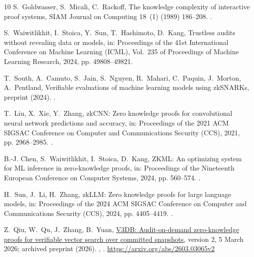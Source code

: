 \documentclass[5p,times,twocolumn]{elsarticle}
\begin{document}
\begin{thebibliography}{10}
S.~Goldwasser, S.~Micali, C.~Rackoff, The knowledge complexity of interactive
  proof systems, SIAM Journal on Computing 18~(1) (1989) 186--208.
\newblock \href {https://doi.org/10.1137/0218012} {}.

S.~Waiwitlikhit, I.~Stoica, Y.~Sun, T.~Hashimoto, D.~Kang, Trustless audits without revealing data or models, in: Proceedings of the 41st International Conference on Machine Learning (ICML), Vol.~235 of Proceedings of Machine Learning Research, 2024, pp. 49808--49821.

T.~South, A.~Camuto, S.~Jain, S.~Nguyen, R.~Mahari, C.~Paquin, J.~Morton,
  A.~Pentland, Verifiable evaluations of machine learning models using
  {zkSNARKs}, preprint (2024).
\newblock \href {http://arxiv.org/abs/2402.02675} {}.


T.~Liu, X.~Xie, Y.~Zhang, {zkCNN}: Zero knowledge proofs for convolutional neural network predictions and accuracy, in: Proceedings of the 2021 ACM SIGSAC Conference on Computer and Communications Security (CCS), 2021, pp. 2968--2985. \newblock \href {https://doi.org/10.1145/3460120.3485379} {}.

B.-J. Chen, S.~Waiwitlikhit, I.~Stoica, D.~Kang, {ZKML}: An optimizing system
  for {ML} inference in zero-knowledge proofs, in: Proceedings of the
  Nineteenth European Conference on Computer Systems, 2024, pp. 560--574.
\newblock \href {https://doi.org/10.1145/3627703.3650088}
  {}.

H.~Sun, J.~Li, H.~Zhang, {zkLLM}: Zero knowledge proofs for large language models, in: Proceedings of the 2024 ACM SIGSAC Conference on Computer and Communications Security (CCS), 2024, pp. 4405--4419. \newblock \href {https://doi.org/10.1145/3658644.3670334} {}.

Z.~Qiu, W.~Qu, J.~Zhang, B.~Yuan,
  \href{https://arxiv.org/abs/2603.03065v2}{{V3DB}: Audit-on-demand
  zero-knowledge proofs for verifiable vector search over committed snapshots},
  version 2, 5 March 2026; archived preprint (2026).
\newblock \href {http://arxiv.org/abs/2603.03065} {},
  \href {https://doi.org/10.48550/arXiv.2603.03065}
  {}.
\newline\urlprefix\url{https://arxiv.org/abs/2603.03065v2}


\end{thebibliography}
\end{document}
